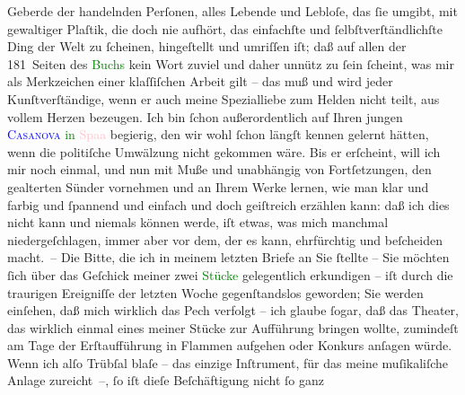                     Geberde der handelnden Perſonen, alles {\pb}Lebende und Lebloſe, das ſie umgibt,
                    mit gewaltiger Plaſtik, die doch nie aufhört, das einfachſte und
                    ſelbſtverſtändlichſte Ding der Welt zu ſcheinen, hingeſtellt und umriſſen iſt;
                    daß auf allen der 181 Seiten des \textcolor{green}{Buchs}{} kein Wort zuviel und daher unnütz zu ſein ſcheint, was mir als
                    Merkzeichen einer klaſſiſchen Arbeit gilt – das muß und wird jeder
                    Kunſtverſtändige, wenn er auch meine Spezialliebe zum Helden nicht teilt, aus
                    vollem Herzen bezeugen. Ich bin ſchon außerordentlich auf Ihren jungen \textcolor{green}{\textcolor{blue}{\textsc{Casanova}}{}\ledrightnote{\textcolor{blue}{Giacomo Girolamo Casanova}} in \textcolor{pink}{Spaa}{}\ledrightnote{\textcolor{pink}{Spa}}}{} begierig, den wir wohl ſchon längſt kennen gelernt hätten, wenn die
                    politiſche Umwälzung nicht gekommen wäre. Bis er erſcheint, will ich mir noch
                    einmal, und nun mit Muße und unabhängig von Fortſetzungen, den gealterten Sünder
                    vornehmen und an Ihrem Werke lernen, wie man klar und farbig und ſpannend und
                    einfach und doch geiſtreich erzählen kann: daß ich dies nicht kann und niemals
                    können werde, iſt etwas, was mich manchmal niedergeſchlagen, immer aber vor dem,
                    der es kann, ehrfürchtig und beſcheiden {\pb}macht. –\pend
           \pstart
           Die Bitte, die ich in meinem letzten Briefe an Sie ſtellte – Sie möchten ſich
                    über das Geſchick meiner zwei \textcolor{green}{Stücke}{} gelegentlich erkundigen – iſt durch die
                    traurigen Ereigniſſe der letzten Woche gegenſtandslos geworden; Sie werden
                    einſehen, daß mich wirklich das Pech verfolgt – ich glaube ſogar, daß das
                    Theater, das wirklich einmal eines meiner Stücke zur Aufführung bringen wollte,
                    zumindeſt am Tage der Erſtaufführung in Flammen aufgehen oder Konkurs anſagen
                    würde. Wenn ich alſo Trübſal blaſe – das einzige Inſtrument, für das meine
                    muſikaliſche Anlage zureicht –, ſo iſt dieſe Beſchäftigung nicht ſo ganz

